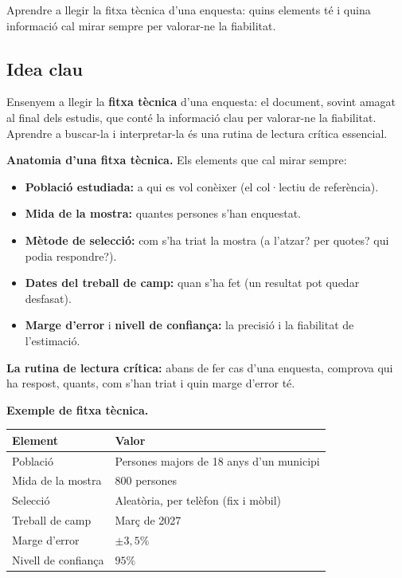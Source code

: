 %
{Aprendre a llegir la fitxa tècnica d'una enquesta: quins elements té i quina informació cal mirar sempre per valorar-ne la fiabilitat.}

\subsection{Idea clau}

Ensenyem a llegir la \textbf{fitxa tècnica} d'una enquesta: el document, sovint amagat al
final dels estudis, que conté la informació clau per valorar-ne la fiabilitat. Aprendre a
buscar-la i interpretar-la és una rutina de lectura crítica essencial.

\begin{idea}
\textbf{Anatomia d'una fitxa tècnica.} Els elements que cal mirar sempre:
\begin{itemize}[leftmargin=1.4em, itemsep=2pt]
  \item \textbf{Població estudiada:} a qui es vol conèixer (el col·lectiu de referència).
  \item \textbf{Mida de la mostra:} quantes persones s'han enquestat.
  \item \textbf{Mètode de selecció:} com s'ha triat la mostra (a l'atzar? per quotes? qui
        podia respondre?).
  \item \textbf{Dates del treball de camp:} quan s'ha fet (un resultat pot quedar desfasat).
  \item \textbf{Marge d'error} i \textbf{nivell de confiança:} la precisió i la fiabilitat
        de l'estimació.
\end{itemize}
\textbf{La rutina de lectura crítica:} abans de fer cas d'una enquesta, comprova qui ha
respost, quants, com s'han triat i quin marge d'error té.
\end{idea}

\noindent\textbf{Exemple de fitxa tècnica.}
\begin{center}
\renewcommand{\arraystretch}{1.3}
\begin{tabular}{l l}
\toprule
\textbf{Element} & \textbf{Valor} \\
\midrule
Població & Persones majors de 18 anys d'un municipi \\
Mida de la mostra & $800$ persones \\
Selecció & Aleatòria, per telèfon (fix i mòbil) \\
Treball de camp & Març de 2027 \\
Marge d'error & $\pm 3,5\%$ \\
Nivell de confiança & $95\%$ \\
\bottomrule
\end{tabular}
\end{center}

